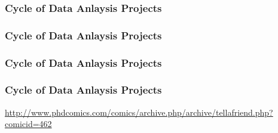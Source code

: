 \documentclass[12pt]{beamer}\usepackage[]{graphicx}\usepackage[]{color}
\begin{document}

\begin{frame}
\begin{center}
\Huge{}
\end{center}
\end{frame}


\begin{frame}
\frametitle{Cycle of Data Anlaysis Projects}
\begin{center}
\end{center}
\end{frame}


\begin{frame}
\frametitle{Cycle of Data Anlaysis Projects}
\begin{center}
\end{center}
\end{frame}


\begin{frame}
\frametitle{Cycle of Data Anlaysis Projects}
\begin{center}
\end{center}
\end{frame}


\begin{frame}
\frametitle{Cycle of Data Anlaysis Projects}
\begin{center}
\end{center}
\end{frame}


\begin{frame}
\begin{center}

{\tiny \url{http://www.phdcomics.com/comics/archive.php/archive/tellafriend.php?comicid=462}}
\end{center}
\end{frame}
\end{document}

